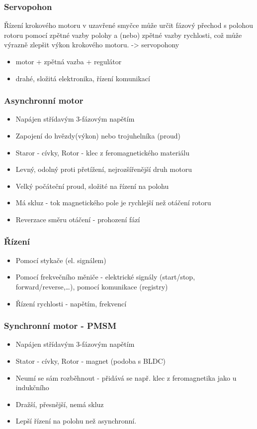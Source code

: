 \subsubsection*{Servopohon}
Řízení krokového motoru v uzavřené smyčce může určit fázový přechod s polohou rotoru pomocí zpětné vazby polohy a (nebo) zpětné vazby rychlosti, což může výrazně zlepšit výkon krokového motoru. -> servopohony
\begin{itemize}
    \item motor + zpětná vazba + regulátor
    \item drahé, složitá elektronika, řízení komunikací
\end{itemize}

\subsubsection*{Asynchronní motor}
\begin{itemize}
    \item Napájen střídavým 3-fázovým napětím
    \item Zapojení do hvězdy(výkon) nebo trojuhelníka (proud)
    \item Staror - cívky, Rotor - klec z feromagnetického materiálu
    \item Levný, odolný proti přetížení, nejrozšířenější druh motoru
    \item Velký počáteční proud, složité na řízení na polohu
    \item Má skluz - tok magnetického pole je rychlejší než otáčení rotoru
    \item Reverzace směru otáčení - prohození fází
\end{itemize}

\subsubsection*{Řízení}
\begin{itemize}
    \item Pomocí stykače (el. signálem)
    \item Pomocí frekvečního měniče - elektrické signály (start/stop, forward/reverse,\dots), pomocí komunikace (registry)
    \item Řízení rychlosti - napětím, frekvencí
\end{itemize}

\subsubsection*{Synchronní motor - PMSM}
\begin{itemize}
    \item Napájen střídavým 3-fázovým napětím
    \item Stator - cívky, Rotor - magnet (podoba s BLDC)
    \item Neumí se sám rozběhnout - přidává se např. klec z feromagnetika jako u indukčního
    \item Dražší, přesnější, nemá skluz
    \item Lepší řízení na polohu než asynchronní.
\end{itemize}

